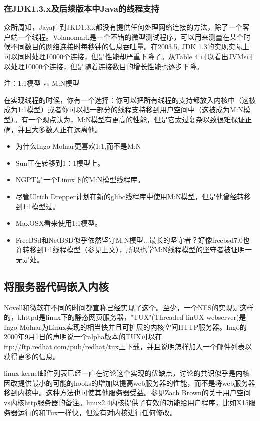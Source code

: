 \documentclass[12pt, twoside, a4paper, xetex]{report}
\begin{document}
\subsubsection*{在JDK1.3.x及后续版本中Java的线程支持}

	众所周知，Java直到JKD1.3.x都没有提供任何处理网络连接的方法，除了一个客户端一个线程。Volanomark是一个不错的微型测试程序，可以用来测量在某个时候不同数目的网络连接时每秒钟的信息吞吐量。在2003.5, JDK 1.3的实现实际上可以同时处理10000个连接，但是性能却严重下降了。从Table 4 可以看出JVMs可以处理10000个连接，但是随着连接数目的增长性能也逐步下降。

	注：1:1模型 vs M:N模型

	在实现线程的时候，你有一个选择：你可以把所有线程的支持都放入内核中（这被成为1:1模型）或者你可以把一部分的线程支持移到用户空间中（这被成为M:N模型）。有一个观点认为，M:N模型有更高的性能，但是它太过复杂以致很难保证正确，并且大多数人正在远离他。
	\begin{itemize}
		\item 为什么Ingo Molnar更喜欢1:1,而不是M:N
		\item Sun正在转移到1：1模型上。
		\item NGPT是一个Linux下的M:N模型线程库。
		\item 尽管Ulrich Drepper计划在新的glibc线程库中使用M:N模型，但是他曾经转移到1:1模型过。
		\item MaxOSX看来使用1:1模型。
		\item FreeBSd和NetBSD似乎依然坚守M:N模型...最长的坚守者？好像freebsd7.0也许转移到1:1线程模型（参见上文），所以也学M:N线程模型的坚守者被证明一无是处。
	\end{itemize}
\subsection*{将服务器代码嵌入内核}

	Novell和微软在不同的时间都宣称已经实现了这个。至少，一个NFS的实现是这样的，khttpd是linux下的静态网页服务器，"TUX"(Threaded linUX webserver)是Ingo Molnar为Linux实现的相当快并且可扩展的内核空间HTTP服务器。Ingo的2000年9月1日的声明说一个alpha版本的TUX可以在ftp://ftp.redhat.com/pub/redhat/tux上下载，并且说明怎样加入一个邮件列表以获得更多的信息。

	linux-kernel邮件列表已经一直在讨论这个实现的优缺点，讨论的共识似乎是内核因改提供最小的可能的hooks的增加以提高web服务器的性能，而不是将web服务器移到内核中。这种方法也可使其他服务器受益。参见Zach Brown的关于用户空间vs内核http服务器的备注。linux2.4内核提供了有效的功能给用户程序，比如X15服务器运行的和Tux一样快，但没有对内核进行任何修改。
\end{document}
